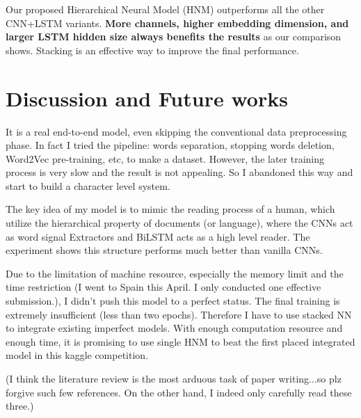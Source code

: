 \documentclass{article}
\begin{document}
Our proposed Hierarchical Neural Model (HNM) outperforms all the other CNN+LSTM variants. {\bf More channels, higher embedding dimension, and larger LSTM hidden size always benefits the results} as our comparison shows. Stacking is an effective way to improve the final performance.

\section{Discussion and Future works}\label{sec:discuss}
It is a real end-to-end model, even skipping the conventional data preprocessing phase. In fact I tried the pipeline: words separation, stopping words deletion, Word2Vec pre-training, etc, to make a dataset. However, the later training process is very slow and the result is not appealing. So I abandoned this way and start to build a character level system.

The key idea of my model is to mimic the reading process of a human, which utilize the hierarchical property of documents (or language), where the CNNs act as word signal Extractors and BiLSTM acts as a high level reader. The experiment shows this structure performs much better than vanilla CNNs.

Due to the limitation of machine resource, especially the memory limit and the time restriction (I went to Spain this April. I only conducted one effective submission.), I didn't push this model to a perfect status. The final training is extremely insufficient (less than two epochs). Therefore I have to use stacked NN to integrate existing imperfect models. With enough computation resource and enough time, it is promising to use single HNM to beat the first placed integrated model in this kaggle competition.


(I think the literature review is the most arduous task of paper writing...so plz forgive such few references. On the other hand, I indeed only carefully read these three.)
\end{document}

